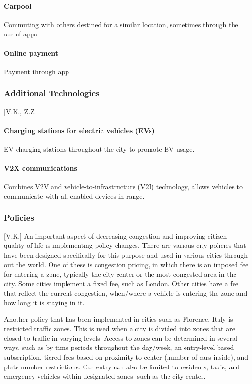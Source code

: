 \documentclass[12pt]{article}                       %
\begin{document}
\paragraph{Carpool} Commuting with others destined for a similar location, sometimes through the use of apps

\paragraph{Online payment} Payment through app

\subsubsection{Additional Technologies}[V.K., Z.Z.]
\paragraph{Charging stations for electric vehicles (EVs)} EV charging stations throughout the city to promote EV usage.

\paragraph{V2X communications} Combines V2V and vehicle-to-infrastructure (V2I) technology, allows vehicles to communicate with all enabled devices in range.

\subsubsection{Policies}[V.K.]
An important aspect of decreasing congestion and improving citizen quality of life is implementing policy changes. There are various city policies that have been designed specifically for this purpose and used in various cities through out the world. One of these is congestion pricing, in which there is an imposed fee for entering a zone, typically the city center or the most congested area in the city. Some cities implement a fixed fee, such as London. Other cities have a fee that reflect the current congestion, when/where a vehicle is entering the zone and how long it is staying in it.

Another policy that has been implemented in cities such as Florence, Italy is restricted traffic zones. This is used when a city is divided into zones that are closed to traffic in varying levels. Access to zones can be determined in several ways, such as by time periods throughout the day/week, an entry-level based subscription, tiered fees based on proximity to center (number of cars inside), and plate number restrictions. Car entry can also be limited to residents, taxis, and emergency vehicles within designated zones, such as the city center. 
\end{document}
